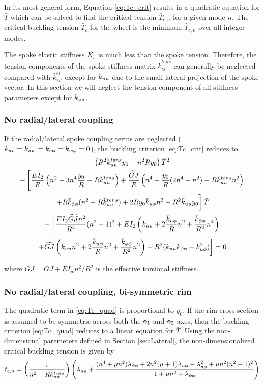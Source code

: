 \documentclass[\rootdir/thesis.tex]{subfiles}
\begin{document}
In its most general form, Equation \eqref{eq:Tc_crit} results in a quadratic equation for $\bar{T}$ which can be solved to find the critical tension $\bar{T}_{c,n}$ for a given mode $n$. The critical buckling tension $\bar{T}_c$ for the wheel is the minimum $\bar{T}_{c,n}$ over all integer modes.

The spoke elastic stiffness $K_s$ is much less than the spoke tension. Therefore, the tension components of the spoke stiffness matrix $\bar{k}_{ij}^{tens}$ can generally be neglected compared with $\bar{k}_{ij}^{el}$, except for $\bar{k}_{uu}$ due to the small lateral projection of the spoke vector. In this section we will neglect the tension component of all stiffness parameters except for $\bar{k}_{uu}$.

\subsubsection{No radial/lateral coupling}
If the radial/lateral spoke coupling terms are neglected ($\bar{k}_{uv}=\bar{k}_{uw}=\bar{k}_{v\phi}=\bar{k}_{w\phi}=0$), the buckling criterion \eqref{eq:Tc_crit} reduces to
\begin{multline}
\label{eq:Tc_quad}
\left(R^2\bar{k}_{uu}^{tens}y_0 - n^2Ry_0 \right)\bar{T}^2\\
-\left[\frac{EI_2}{R}\left(n^2 - 3n^4 \frac{y_0}{R} + R\bar{k}_{uu}^{tens}\right)
       +\frac{\widetilde{GJ}}{R}\left(n^4 - \frac{y_0}{R}(2n^4 - n^2) - R\bar{k}_{uu}^{tens}n^2\right) \right.\\
       \left. +R\bar{k}_{\phi\phi} (n^2 - R\bar{k}_{uu}^{tens}) + 2Ry_0\bar{k}_{u\phi} n^2 - R^2\bar{k}_{uu} y_0 \vphantom{\frac12} \right]\bar{T}\\
+\left[\frac{EI_2 \widetilde{GJ} n^2}{R^4}(n^2-1)^2
       +EI_2\left(\bar{k}_{uu} + 2\frac{\bar{k}_{u\phi}}{R}n^2 + \frac{\bar{k}_{\phi\phi}}{R^2}n^4\right) \right.\\
       \left. +\widetilde{GJ}\left(\bar{k}_{uu} n^2 + 2\frac{\bar{k}_{u\phi}}{R}n^2 + \frac{\bar{k}_{\phi\phi}}{R^2}n^2\right)
       +R^2(\bar{k}_{uu}\bar{k}_{\phi\phi} - \bar{k}_{u\phi}^2)\right] = 0
\end{multline}

where $\widetilde{GJ} = GJ + EI_wn^2/R^2$ is the effective torsional stiffness.

\subsubsection{No radial/lateral coupling, bi-symmetric rim}
The quadratic term in \eqref{eq:Tc_quad} is proportional to $y_0$. If the rim cross-section is assumed to be symmetric across both the $\mathbf{e}_1$ and $\mathbf{e}_2$ axes, then the buckling criterion \eqref{eq:Tc_quad} reduces to a linear equation for $\bar{T}$. Using the non-dimensional paremeters defined in Section \ref{sec:Lateral}, the non-dimensionalized critical buckling tension is given by
\begin{equation}
\label{eq:Tcn_lin}
t_{c,n} = \left(\frac{1}{n^2 - R\bar{k}_{uu}^{tens}}\right)
\left(\lambda_{uu}
      +\frac{(n^4 + \mu n^2)\lambda_{\phi\phi}
             +2n^2(\mu + 1)\lambda_{u\phi} - \lambda_{u\phi}^2
             +\mu n^2(n^2-1)^2}
        {1 + \mu n^2 + \lambda_{\phi\phi}}\right)
\end{equation}
\end{document}
